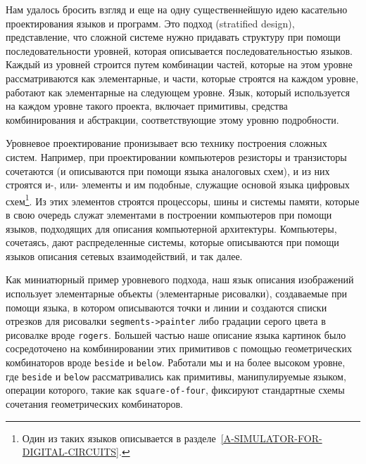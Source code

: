 Нам удалось бросить взгляд и еще на одну существеннейшую
идею касательно проектирования языков и программ. Это подход 
 (stratified design),
представление, что сложной системе нужно придавать структуру при
помощи последовательности уровней, которая описывается
последовательностью языков.  Каждый из уровней строится путем
комбинации частей, которые на этом уровне рассматриваются как
элементарные, и части, которые строятся на каждом уровне,
работают как элементарные на следующем уровне.  Язык, который
используется на каждом уровне такого проекта, включает примитивы,
средства комбинирования и абстракции, соответствующие этому уровню
подробности.

Уровневое проектирование пронизывает всю технику
построения сложных систем.  Например, при проектировании компьютеров
резисторы и транзисторы сочетаются (и описываются при помощи языка
аналоговых схем), и из них строятся и-, или- элементы и им подобные,
служащие основой языка цифровых схем\footnote{Один из таких языков описывается в разделе~\ref{A-SIMULATOR-FOR-DIGITAL-CIRCUITS}.}.
Из этих элементов строятся процессоры, шины и системы памяти, которые
в свою очередь служат элементами в построении компьютеров при помощи 
языков, подходящих для описания компьютерной архитектуры.  Компьютеры, 
сочетаясь, дают распределенные системы, которые описываются при помощи 
языков описания сетевых взаимодействий, и так далее.

Как миниатюрный пример уровневого подхода, наш
язык описания изображений использует элементарные объекты (элементарные 
рисовалки), создаваемые при помощи языка, в котором описываются
точки и линии и создаются списки отрезков для рисовалки
{\tt segments->painter} либо градации серого цвета в рисовалке
вроде {\tt rogers}.  Большей частью наше описание языка
картинок было сосредоточено на комбинировании этих примитивов с
помощью геометрических комбинаторов вроде {\tt beside} и
{\tt below}.  Работали мы и на более высоком уровне, где
{\tt beside} и {\tt below} рассматривались как
примитивы, манипулируемые языком, операции которого, такие как
{\tt square-of-four}, фиксируют стандартные схемы сочетания
геометрических комбинаторов.

